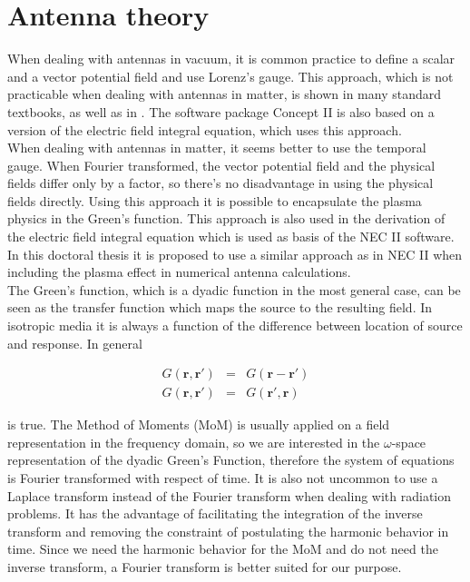 \documentclass[a4paper,11pt]{thesis}
\begin{document}
\chapter{Antenna theory}
When dealing with antennas in vacuum, it is common practice to define a scalar and a vector potential field and use Lorenz's gauge. This approach, which is not practicable when dealing with antennas in matter, is shown in many standard textbooks, as well as in \cite{my_masterthesis}. The software package Concept II is also based on a version of the electric field integral equation, which uses this approach. \\

When dealing with antennas in matter, it seems better to use the temporal gauge. When Fourier transformed, the vector potential field and the physical fields differ only by a factor, so there's no disadvantage in using the physical fields directly. Using this approach it is possible to encapsulate the plasma physics in the Green's function. This approach is also used in the derivation of the electric field integral equation which is used as basis of the NEC II software. In this doctoral thesis it is proposed to use a similar approach as in NEC II when including the plasma effect in numerical antenna calculations.\\

The Green's function, which is a dyadic function in the most general case, can be seen as the transfer function which maps the source to the resulting field. In isotropic media it is always a function of the difference between location of source and response. In general

\begin{eqnarray}
  G(\mathbf{r},\mathbf{r}') &=& G(\mathbf{r}-\mathbf{r}') \\
G(\mathbf{r},\mathbf{r}') &=& G(\mathbf{r}',\mathbf{r})\end{eqnarray}


is true. The Method of Moments (MoM) is usually applied on a field representation in the frequency domain, so we are interested in the $\omega$-space representation of the dyadic Green's Function, therefore the system of equations is Fourier transformed with respect of time. It is also not uncommon to use a Laplace transform instead of the Fourier transform when dealing with radiation problems. It has the advantage of facilitating the integration of the inverse transform and removing the constraint of postulating the harmonic behavior in time. Since we need the harmonic behavior for the MoM and do not need the inverse transform, a Fourier transform is better suited for our purpose.\\
\end{document}

